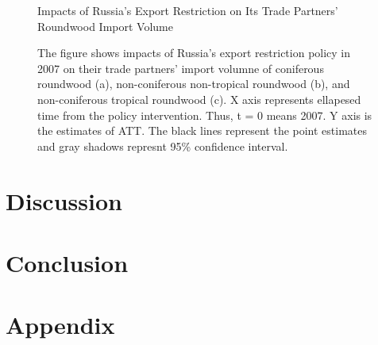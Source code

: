 \documentclass[a4paper,12pt]{article}
\begin{document}
\begin{figure}[htbp] 
    \centering
    \caption{Impacts of Russia's Export Restriction on Its Trade Partners' Roundwood Import Volume}
    \caption*{\small{The figure shows impacts of Russia's export restriction policy in 2007 on their trade partners' import volumne of coniferous roundwood (a), non-coniferous non-tropical roundwood (b), and non-coniferous tropical roundwood (c). X axis represents ellapesed time from the policy intervention. Thus, t = 0 means 2007. Y axis is the estimates of ATT. The black lines represent the point estimates and gray shadows represnt 95\% confidence interval.}}
    \label{fig:competitor_prod_Myanmar}
\end{figure}


\section{Discussion}

\section{Conclusion}



\section*{Appendix}
\end{document}
